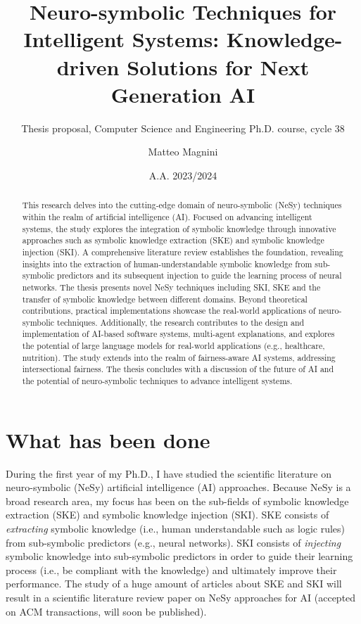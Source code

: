 \documentclass[]{scrartcl}
\title{
    Neuro-symbolic Techniques for Intelligent Systems:
    Knowledge-driven Solutions for Next Generation AI
}
\subtitle{Thesis proposal, Computer Science and Engineering Ph.D. course, cycle 38}
\author{Matteo Magnini}
\date{A.A. 2023/2024}
\begin{document}
    
    \maketitle
    
    \begin{abstract}
        This research delves into the cutting-edge domain of neuro-symbolic (NeSy) techniques within the realm of artificial intelligence (AI).
        Focused on advancing intelligent systems, the study explores the integration of symbolic knowledge through innovative approaches such as symbolic knowledge extraction (SKE) and symbolic knowledge injection (SKI).
        A comprehensive literature review establishes the foundation, revealing insights into the extraction of human-understandable symbolic knowledge from sub-symbolic predictors and its subsequent injection to guide the learning process of neural networks.
        The thesis presents novel NeSy techniques including SKI, SKE and the transfer of symbolic knowledge between different domains.
        Beyond theoretical contributions, practical implementations showcase the real-world applications of neuro-symbolic techniques.
        Additionally, the research contributes to the design and implementation of AI-based software systems, multi-agent explanations, and explores the potential of large language models for real-world applications (e.g., healthcare, nutrition).
        The study extends into the realm of fairness-aware AI systems, addressing intersectional fairness.
        The thesis concludes with a discussion of the future of AI and the potential of neuro-symbolic techniques to advance intelligent systems.
    \end{abstract}
    
    \section{What has been done}
    \label{sec:done}

    During the first year of my Ph.D., I have studied the scientific literature on neuro-symbolic (NeSy) artificial intelligence (AI) approaches.
    Because NeSy is a broad research area, my focus has been on the sub-fields of symbolic knowledge extraction (SKE) and symbolic knowledge injection (SKI).
    SKE consists of \emph{extracting} symbolic knowledge (i.e., human understandable such as logic rules) from sub-symbolic predictors (e.g., neural networks).
    SKI consists of \emph{injecting} symbolic knowledge into sub-symbolic predictors in order to guide their learning process (i.e., be compliant with the knowledge) and ultimately improve their performance.
    The study of a huge amount of articles about SKE and SKI will result in a scientific literature review paper on NeSy approaches for AI (accepted on ACM transactions, will soon be published).
\end{document}
